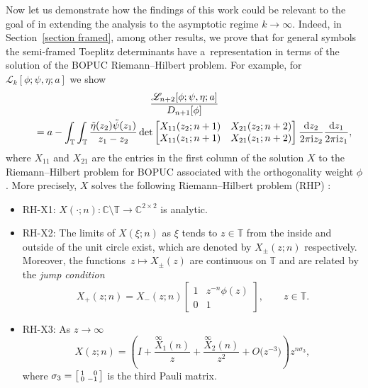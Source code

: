 \documentclass[pdftex]{sigma}
\numberwithin{equation}{section}
\newcommand{\C}{{\mathbb C}}
\newcommand{\T}{{\mathbb T}}
\newcommand{\di}{\displaystyle}
\newcommand{\ii}{{\rm i}}
\newcommand{\dd}{{\rm d}}
\begin{document}
	Now let us demonstrate how the findings of this work could be relevant to the goal of \cite{BGIKMMV} in extending the analysis to the asymptotic regime $k \to \infty$. Indeed, in Section~\ref{section framed}, among other results, we prove that for general symbols the semi-framed Toeplitz determinants have a~representation in terms of the solution of the BOPUC Riemann--Hilbert problem. For example, for~${\mathscr{L}_k[\phi;\psi,\eta;a]}$ we show
\begin{gather}
		\frac{\mathscr{L}_{n+2}[\phi;\psi, \eta ;a]}{D_{n+1}[\phi]} \nonumber\\
\qquad = a - \int_{\T} \int_{\T} \frac{ \Tilde{\eta}(z_2) \tilde{\psi}(z_1)}{z_1-z_2} \det \begin{bmatrix}
			X_{11}(z_2;n+1) & X_{21}(z_2;n+2) \\
			X_{11}(z_1;n+1) & X_{21}(z_1;n+2)
		\end{bmatrix} \frac{\dd z_2}{2 \pi \ii z_2} \frac{\dd z_1}{2 \pi \ii z_1},\label{L X intro}
	\end{gather}
	where $X_{11}$ and $X_{21}$ are the entries in the first column of the solution $X$ to the Riemann--Hilbert problem for BOPUC associated with the orthogonality weight $\phi$. More precisely, $X$ solves the following Riemann--Hilbert problem (RHP) \cite{BDJ}:
	\begin{itemize}\itemsep=0pt
		\item RH-X1: %
$X(\cdot;n)\colon \C\setminus \T \to \C^{2\times2}$ is analytic.
		\item RH-X2: %
The limits of $X(\xi;n)$ as $\xi$ tends to $z \in \T $ from the inside and outside of the unit circle exist, which are denoted by $X_{\pm}(z;n)$ respectively. Moreover, the functions~${z \mapsto X_{\pm}(z)}$ are continuous on $\T$ and are related by the \textit{jump condition}
		\begin{equation*}
			X_+(z;n)=X_-(z;n)\begin{bmatrix}
				1 & z^{-n}\phi(z) \\
				0 & 1
			\end{bmatrix}, \qquad z \in \T.
		\end{equation*}
		\item RH-X3: %
 As $z \to \infty$
		\begin{equation}\label{X asymp1}
			X(z;n)=\left(\di I+\frac{ \overset{\infty}{X}_1(n)}{z}+\frac{\overset{\infty}{X}_2(n)}{z^2} + O\big(z^{-3}\big)\right) z^{n \sigma_3},
		\end{equation}
		where $\sigma_3 = \left[\begin{smallmatrix} 1 & \hphantom{-}0 \\ 0 & -1 \end{smallmatrix}\right]$ is the third Pauli matrix.
	\end{itemize}
\end{document}
